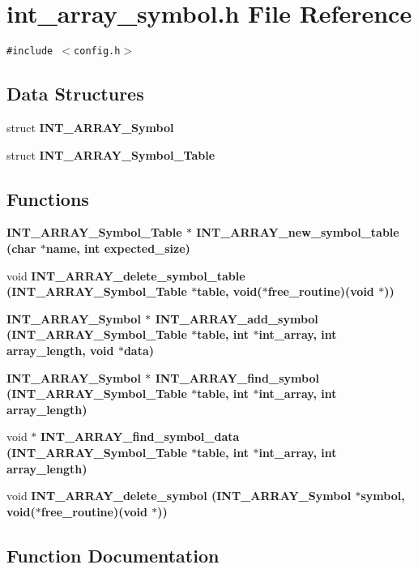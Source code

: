 \section{int\_\-array\_\-symbol.h File Reference}
\label{int__array__symbol_8h}
{\tt \#include $<$config.h$>$}\par
\subsection*{Data Structures}
\begin{CompactItemize}
\item 
struct \bf{INT\_\-ARRAY\_\-Symbol}
\item 
struct \bf{INT\_\-ARRAY\_\-Symbol\_\-Table}
\end{CompactItemize}
\subsection*{Functions}
\begin{CompactItemize}
\item 
\bf{INT\_\-ARRAY\_\-Symbol\_\-Table} $\ast$ \bf{INT\_\-ARRAY\_\-new\_\-symbol\_\-table} (char $\ast$\bf{name}, int expected\_\-size)
\item 
void \bf{INT\_\-ARRAY\_\-delete\_\-symbol\_\-table} (\bf{INT\_\-ARRAY\_\-Symbol\_\-Table} $\ast$table, void($\ast$free\_\-routine)(void $\ast$))
\item 
\bf{INT\_\-ARRAY\_\-Symbol} $\ast$ \bf{INT\_\-ARRAY\_\-add\_\-symbol} (\bf{INT\_\-ARRAY\_\-Symbol\_\-Table} $\ast$table, int $\ast$int\_\-array, int array\_\-length, void $\ast$data)
\item 
\bf{INT\_\-ARRAY\_\-Symbol} $\ast$ \bf{INT\_\-ARRAY\_\-find\_\-symbol} (\bf{INT\_\-ARRAY\_\-Symbol\_\-Table} $\ast$table, int $\ast$int\_\-array, int array\_\-length)
\item 
void $\ast$ \bf{INT\_\-ARRAY\_\-find\_\-symbol\_\-data} (\bf{INT\_\-ARRAY\_\-Symbol\_\-Table} $\ast$table, int $\ast$int\_\-array, int array\_\-length)
\item 
void \bf{INT\_\-ARRAY\_\-delete\_\-symbol} (\bf{INT\_\-ARRAY\_\-Symbol} $\ast$symbol, void($\ast$free\_\-routine)(void $\ast$))
\end{CompactItemize}


\subsection{Function Documentation}

